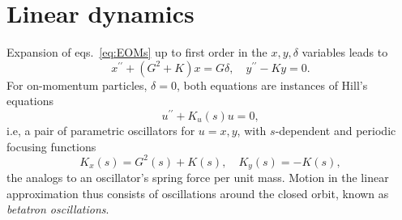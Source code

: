 \section{Linear dynamics}
Expansion of eqs.~\eqref{eq:EOMs} up to first order in the $x, y, \delta$ variables leads to \cite{sands_physics_1969}
    \begin{equation}
        x^{\prime\prime}+(G^2+K)x=G\delta, \quad
        y^{\prime\prime}-Ky=0.
        \label{eq:linearEOM}
    \end{equation}
    For on-momentum particles, $\delta=0$, both equations are instances of Hill's equations
    \begin{equation}
        u^{\prime\prime}+K_u(s)u = 0,
        \label{eq:Hill}
    \end{equation}
   i.e, a pair of parametric oscillators for $u=x,y$, with $s$-dependent and periodic focusing functions
         $$K_x(s) = G^2(s) + K(s), \quad K_y(s) = - K(s),$$
    the analogs to an oscillator's spring force per unit mass. Motion in the linear approximation thus consists of oscillations around the closed orbit, known as \textit{betatron oscillations}.
